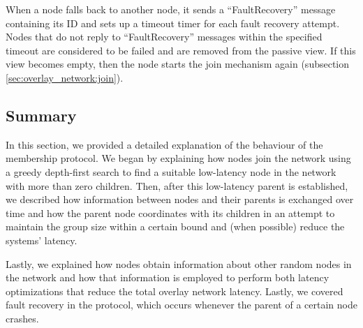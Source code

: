 When a node falls back to another node, it sends a ``FaultRecovery'' message containing its ID and sets up a timeout timer for each fault recovery attempt. Nodes that do not reply to ``FaultRecovery'' messages within the specified timeout are considered to be failed and are removed from the passive view. If this view becomes empty, then the node starts the join mechanism again (subsection \ref{sec:overlay_network:join}).

\subsection{Summary}

In this section, we provided a detailed explanation of the behaviour of the membership protocol. We began by explaining how nodes join the network using a greedy depth-first search to find a suitable low-latency node in the network with more than zero children. Then, after this low-latency parent is established, we described how information between nodes and their parents is exchanged over time and how the parent node coordinates with its children in an attempt to maintain the group size within a certain bound and (when possible) reduce the systems' latency.

Lastly, we explained how nodes obtain information about other random nodes in the network and how that information is employed to perform both latency optimizations that reduce the total overlay network latency. Lastly, we covered fault recovery in the protocol, which occurs whenever the parent of a certain node crashes.